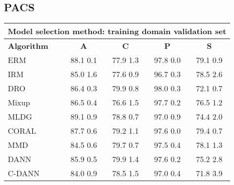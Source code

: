 \documentclass{article}
\begin{document}
\subsection{PACS}
\begin{center}
\begin{tabular}{lcccc}
\toprule
\multicolumn{5}{c}{\textbf{Model selection method: training domain validation set}} \\
\midrule
\textbf{Algorithm}    & \textbf{A}                & \textbf{C}                & \textbf{P}                & \textbf{S}                \\
\midrule
ERM                       & 88.1  0.1            & 77.9  1.3            & 97.8  0.0            & 79.1  0.9            \\
IRM                       & 85.0  1.6            & 77.6  0.9            & 96.7  0.3            & 78.5  2.6            \\
DRO                 & 86.4  0.3            & 79.9  0.8            & 98.0  0.3            & 72.1  0.7            \\
Mixup                     & 86.5  0.4            & 76.6  1.5            & 97.7  0.2            & 76.5  1.2            \\
MLDG                      & 89.1  0.9            & 78.8  0.7            & 97.0  0.9            & 74.4  2.0            \\
CORAL                     & 87.7  0.6            & 79.2  1.1            & 97.6  0.0            & 79.4  0.7            \\
MMD                       & 84.5  0.6            & 79.7  0.7            & 97.5  0.4            & 78.1  1.3            \\
DANN                       & 85.9  0.5            & 79.9  1.4            & 97.6  0.2            & 75.2  2.8            \\
C-DANN                   & 84.0  0.9            & 78.5  1.5            & 97.0  0.4            & 71.8  3.9            \\
\bottomrule
\end{tabular}
\end{center}
\end{document}
